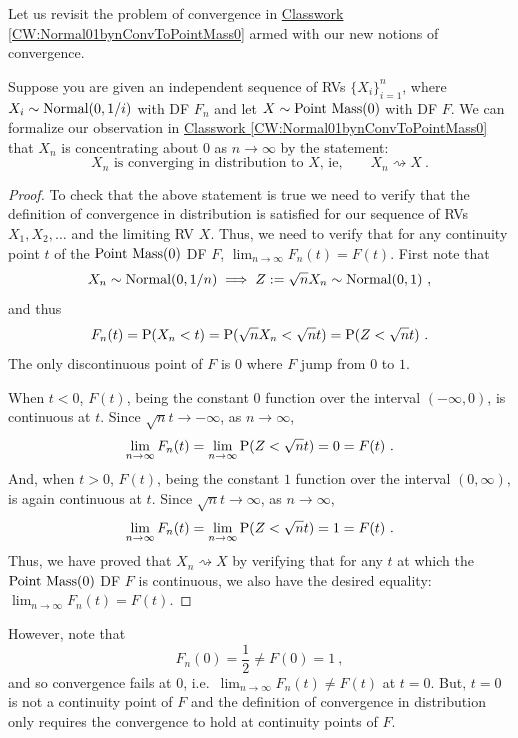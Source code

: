 Let us revisit the problem of convergence in \hyperref[CW:Normal01bynConvToPointMass0]{Classwork \ref*{CW:Normal01bynConvToPointMass0}} armed with our new notions of convergence.
\begin{example}\label{EX:Normal01bynConvinDistToPointMass0}
Suppose you are given an independent sequence of RVs $\{X_i \}_{i=1}^n$, where $X_i \sim \normal(0,1/i)$ with DF $F_n$ and let $X \sim \pointmass(0)$ with DF $F$.  We can formalize our observation in \hyperref[CW:Normal01bynConvToPointMass0]{Classwork \ref*{CW:Normal01bynConvToPointMass0}} that $X_n$ is concentrating about $0$ as $n \to \infty$ by the statement:
\[
\text{$X_n$ is converging in distribution to $X$, ie,} \qquad X_n \rightsquigarrow X \ .
\]
{\normalsize
\begin{proof}
To check that the above statement is true we need to verify that the definition of convergence in distribution is satisfied for our sequence of RVs $X_1,X_2,\ldots$ and the limiting RV $X$.  Thus, we need to verify that for any continuity point $t$ of the $\pointmass(0)$ DF $F$, $\lim_{n \to \infty} F_n(t)=F(t)$.  First note that 
\[
X_n \sim \normal(0,1/n) \implies Z := \sqrt{n} X_n \sim \normal(0,1) \ ,
\]
and thus
\[
F_n(t) = \P(X_n < t) = \P(\sqrt{n} X_n < \sqrt{n} t) = \P(Z < \sqrt{n} t) \ .
\]
The only discontinuous point of $F$ is $0$ where $F$ jump from $0$ to $1$.  

When $t < 0$, $F(t)$, being the constant $0$ function over the interval $(-\infty,0)$, is continuous at $t$.  Since $\sqrt{n} t \to -\infty$, as $n \to \infty$,
\[
\lim_{n \to \infty} F_n(t)  = \lim_{n \to \infty} \P(Z < \sqrt{n} t) = 0 = F(t) \ .
\]
And, when $t >0$, $F(t)$, being the constant $1$ function over the interval $(0,\infty)$, is again continuous at $t$.  Since $\sqrt{n} t \to \infty$, as $n \to \infty$,
\[
\lim_{n \to \infty} F_n(t)  = \lim_{n \to \infty} \P(Z < \sqrt{n} t) = 1 = F(t) \ .
\]
Thus, we have proved that $X_n \rightsquigarrow X$ by verifying that for any $t$ at which the $\pointmass(0)$ DF $F$ is continuous, we also have the desired equality: $\lim_{n \to \infty} F_n(t)=F(t)$.
\end{proof}
However, note that 
\[
F_n(0)=\frac{1}{2} \neq F(0)=1 \ ,
\]
and so convergence fails at $0$, i.e.~$\lim_{n \to \infty}F_n(t) \neq F(t)$ at $t=0$.  But, $t=0$ is not a continuity point of $F$ and the definition of convergence in distribution only requires the convergence to hold at continuity points of $F$.
}
\end{example}

